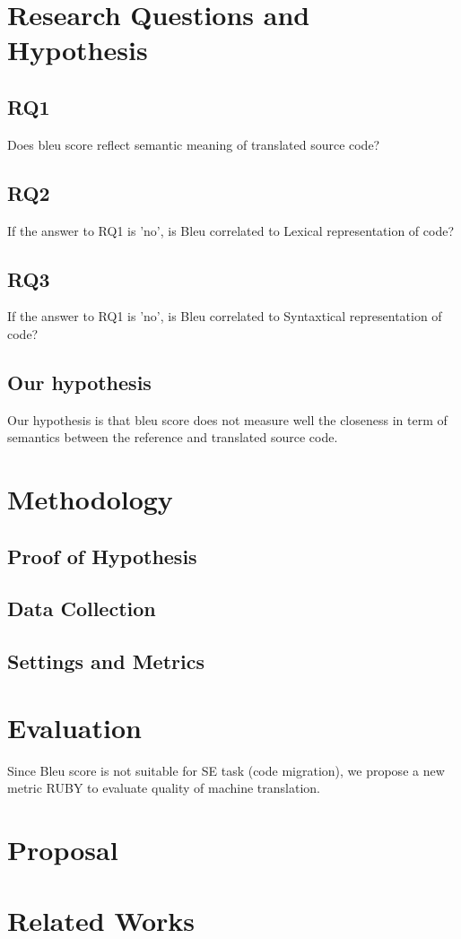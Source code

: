\section{Research Questions and Hypothesis}
\subsection{RQ1}
Does bleu score reflect semantic meaning of translated source code?
\subsection{RQ2} 
If the answer to RQ1 is 'no', is Bleu correlated to Lexical representation of code?
\subsection{RQ3} 
If the answer to RQ1 is 'no', is Bleu correlated to Syntaxtical representation of code?
\subsection{Our hypothesis}
Our hypothesis is that bleu score does not measure well the closeness in term of semantics between the reference and translated source code. 
\section{Methodology}
\subsection{Proof of Hypothesis}
\subsection{Data Collection}
\subsection{Settings and Metrics}
\section{Evaluation}
Since Bleu score is not suitable for SE task (code migration), we propose a new metric RUBY to evaluate quality of machine translation. 
\section{Proposal}
\section{Related Works}

